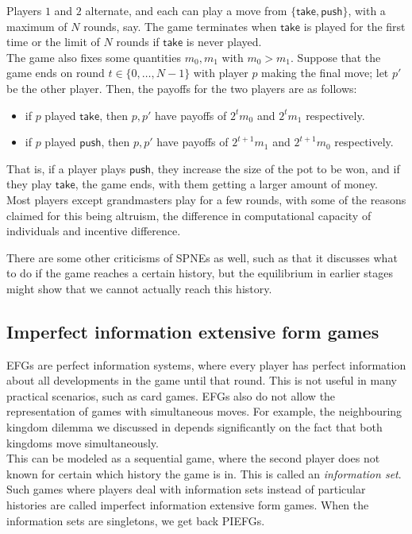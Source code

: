 	\begin{fex}
		Players $1$ and $2$ alternate, and each can play a move from $\{\mathsf{take},\mathsf{push}\}$, with a maximum of $N$ rounds, say. The game terminates when $\mathsf{take}$ is played for the first time or the limit of $N$ rounds if $\mathsf{take}$ is never played.\\
		The game also fixes some quantities $m_0,m_1$ with $m_0 > m_1$. Suppose that the game ends on round $t \in \{0,\ldots,N-1\}$ with player $p$ making the final move; let $p'$ be the other player. Then, the payoffs for the two players are as follows:
		\begin{itemize}
			\item if $p$ played $\mathsf{take}$, then $p,p'$ have payoffs of $2^t m_0$ and $2^tm_1$ respectively.
			\item if $p$ played $\mathsf{push}$, then $p,p'$ have payoffs of $2^{t+1}m_1$ and $2^{t+1}m_0$ respectively.
		\end{itemize}
		That is, if a player plays $\mathsf{push}$, they increase the size of the pot to be won, and if they play $\mathsf{take}$, the game ends, with them getting a larger amount of money.\\
		Most players except grandmasters play for a few rounds, with some of the reasons claimed for this being altruism, the difference in computational capacity of individuals and incentive difference.
	\end{fex}

	There are some other criticisms of SPNEs as well, such as that it discusses what to do if the game reaches a certain history, but the equilibrium in earlier stages might show that we cannot actually reach this history.

\subsection{Imperfect information extensive form games}

	EFGs are perfect information systems, where every player has perfect information about all developments in the game until that round. This is not useful in many practical scenarios, such as card games. EFGs also do not allow the representation of games with simultaneous moves. For example, the neighbouring kingdom dilemma we discussed in  depends significantly on the fact that both kingdoms move simultaneously.\\
	This can be modeled as a sequential game, where the second player does not known for certain which history the game is in. This is called an \emph{information set}. Such games where players deal with information sets instead of particular histories are called imperfect information extensive form games. When the information sets are singletons, we get back PIEFGs.

